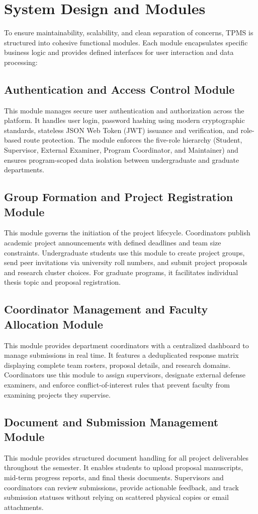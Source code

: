 \section{System Design and Modules}
To ensure maintainability, scalability, and clean separation of concerns, TPMS is structured into cohesive functional modules. Each module encapsulates specific business logic and provides defined interfaces for user interaction and data processing:

\subsection{Authentication and Access Control Module}
This module manages secure user authentication and authorization across the platform. It handles user login, password hashing using modern cryptographic standards, stateless JSON Web Token (JWT) issuance and verification, and role-based route protection. The module enforces the five-role hierarchy (Student, Supervisor, External Examiner, Program Coordinator, and Maintainer) and ensures program-scoped data isolation between undergraduate and graduate departments.

\subsection{Group Formation and Project Registration Module}
This module governs the initiation of the project lifecycle. Coordinators publish academic project announcements with defined deadlines and team size constraints. Undergraduate students use this module to create project groups, send peer invitations via university roll numbers, and submit project proposals and research cluster choices. For graduate programs, it facilitates individual thesis topic and proposal registration.

\subsection{Coordinator Management and Faculty Allocation Module}
This module provides department coordinators with a centralized dashboard to manage submissions in real time. It features a deduplicated response matrix displaying complete team rosters, proposal details, and research domains. Coordinators use this module to assign supervisors, designate external defense examiners, and enforce conflict-of-interest rules that prevent faculty from examining projects they supervise.

\subsection{Document and Submission Management Module}
This module provides structured document handling for all project deliverables throughout the semester. It enables students to upload proposal manuscripts, mid-term progress reports, and final thesis documents. Supervisors and coordinators can review submissions, provide actionable feedback, and track submission statuses without relying on scattered physical copies or email attachments.


